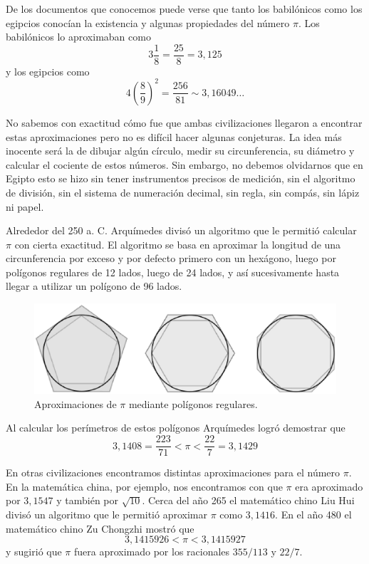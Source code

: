 De los documentos que conocemos puede verse que tanto los babilónicos como los
egipcios conocían la existencia y algunas propiedades del número $\pi$. Los
babilónicos lo aproximaban como
\[
	3\frac18=\frac{25}{8}=3,125
\]
y los egipcios como 
\[
	4\left(\frac89\right)^2=\frac{256}{81}\sim 3,16049\dots
\]

No sabemos con exactitud cómo fue que ambas civilizaciones llegaron a encontrar
estas aproximaciones pero no es difícil hacer algunas conjeturas. La idea más
inocente será la de dibujar algún círculo, medir su circunferencia, su diámetro y
calcular el cociente de estos números. Sin embargo, no debemos olvidarnos que
en Egipto esto se hizo sin tener instrumentos precisos de medición, sin el
algoritmo de división, sin el sistema de numeración decimal, sin regla, sin
compás, sin lápiz ni papel. 

Alrededor del 250 a. C. Arquímedes divisó un algoritmo que le permitió calcular
$\pi$ con cierta exactitud. El algoritmo se basa en aproximar la longitud de
una circunferencia por exceso y por defecto primero con un hexágono, luego por
polígonos regulares de 12 lados, luego de 24 lados, y así sucesivamente hasta llegar a utilizar
un polígono de 96 lados.  

\begin{figure}[h]
		\centering
		\includegraphics[scale=0.4]{images/archimedes}
		\caption{Aproximaciones de $\pi$ mediante polígonos regulares.}
		\label{fig:Arquimedes}
\end{figure}

Al calcular los perímetros de estos polígonos
Arquímedes logró demostrar que
\[
	3,1408=\frac{223}{71}<\pi<\frac{22}{7}=3,1429
\]

En otras civilizaciones encontramos distintas aproximaciones para el número
$\pi$. En la matemática china, por ejemplo, nos encontramos con que $\pi$ era
aproximado por $3,1547$ y también por $\sqrt{10}$. Cerca del año 265 el
matemático chino Liu Hui divisó un algoritmo que le permitió aproximar $\pi$
como $3,1416$.  En el año 480 el matemático chino Zu Chongzhi mostró que 
\[
	3,1415926<\pi<3,1415927
\]
y sugirió que $\pi$ fuera aproximado por los racionales $355/113$ y $22/7$. 

